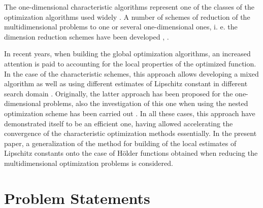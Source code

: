 \documentclass[procedia]{easychair}
\begin{document}
The one-dimensional characteristic algorithms represent one of the classes of the
optimization algorithms used widely \cite{optHandbook}. A number of schemes of reduction of the
multidimensional problems to one or several one-dimensional ones, i. e. the dimension
reduction schemes have been developed \cite{stronginBook}, \cite{butzCurves}.
\par
In recent years, when building the global optimization algorithms, an increased attention
is paid to accounting for the local properties of the optimized function. In the
case of the characteristic schemes, this approach allows developing a mixed algorithm
\cite{mixedAlg} as well as using different estimates of Lipschitz constant in different search
domain \cite{sergLocalTuningFirst}. Originally, the latter approach has been proposed for the one-dimensional
problems, also the investigation of this one when using the nested optimization scheme
has been carried out \cite{nestedLocal}. In all these cases, this approach have demonstrated itself to
be an efficient one, having allowed accelerating the convergence of the characteristic
optimization methods essentially. In the present paper, a generalization of the method
for building of the local estimates of Lipschitz constants onto the case of Hölder
functions obtained when reducing the multidimensional optimization problems is considered.

\section{Problem Statements}
\label{sect:problem}
\end{document}
